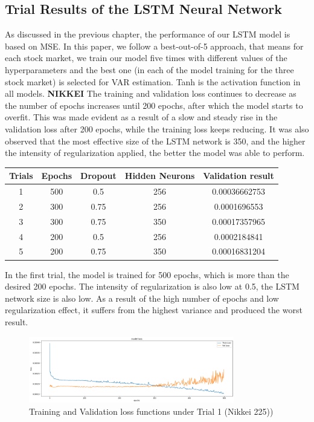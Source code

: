\documentclass[a4paper,11pt,oneside]{book}
\begin{document}
\subsection{Trial Results of the LSTM Neural Network}

As discussed in the previous chapter, the performance of our LSTM model is based on MSE. In this paper, we follow a best-out-of-5 approach, that means for each stock market, we train our model five times with different values of the hyperparameters and the best one (in each of the model training for the three stock market) is selected for VAR estimation. Tanh is the activation function in all models.\newline
\textbf{NIKKEI}\newline
The training and validation loss continues to decrease as the number of epochs increases until 200 epochs,
after which the model starts to overfit. This was made evident as a result of a slow and steady rise in the
validation loss after 200 epochs, while the training loss keeps reducing.
It was also observed that the most effective size of the LSTM network is 350, and the higher the intensity
of regularization applied, the better the model was able to perform.\newline

\begin{center}
	\begin{tabular}{||c c c c c||} 
		\hline
		Trials & Epochs & Dropout & Hidden Neurons & Validation result\\ [0.5ex] 
		\hline\hline
		1 & 500 & 0.5 & 256 & 0.00036662753 \\ 
		\hline
		2 & 300 & 0.75 & 256 & 0.0001696553 \\
		\hline
		3 & 300 & 0.75 & 350 & 0.00017357965 \\
		\hline
		4 & 200 & 0.5 & 256 & 0.0002184841 \\
		\hline
		5 & 200 & 0.75 & 350 & 0.00016831204\\ [1ex] 
		\hline
	\end{tabular}
\end{center}

In the first trial, the model is trained for 500 epochs, which is more than the desired 200 epochs. The intensity of
regularization is also low at 0.5, the LSTM network size is also low. As a result of the high number of
epochs and low regularization effect, it suffers from the highest variance and produced the worst result.\newline
\begin{figure}[!h]
	\centering
	\includegraphics[width=0.8\textwidth]{figures/Nik1}
	\caption{Training and Validation loss functions under Trial 1 (Nikkei 225))}
	\label{Nik1}
\end{figure}
\end{document}
